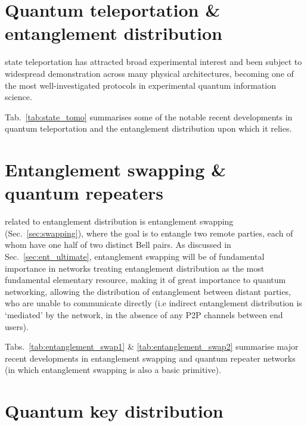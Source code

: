 \section{Quantum teleportation \& entanglement distribution}   

 state teleportation has attracted broad experimental interest and been subject to widespread demonstration across many physical architectures, becoming one of the most well-investigated protocols in experimental quantum information science. 

Tab.~\ref{tab:state_tomo} summarises some of the notable recent developments in quantum teleportation and the entanglement distribution upon which it relies.

%
%

\section{Entanglement swapping \& quantum repeaters}  

 related to entanglement distribution is entanglement swapping (Sec.~\ref{sec:swapping}), where the goal is to entangle two remote parties, each of whom have one half of two distinct Bell pairs. As discussed in Sec.~\ref{sec:ent_ultimate}, entanglement swapping will be of fundamental importance in networks treating entanglement distribution as the most fundamental elementary resource, making it of great importance to quantum networking, allowing the distribution of entanglement between distant parties, who are unable to communicate directly (i.e indirect entanglement distribution is `mediated' by the network, in the absence of any P2P channels between end users). 

Tabs.~\ref{tab:entanglement_swap1} \& \ref{tab:entanglement_swap2} summarise major recent developments in entanglement swapping and quantum repeater networks (in which entanglement swapping is also a basic primitive).

%
%

\section{Quantum key distribution} \label{bib:QKD_state_of_art}

